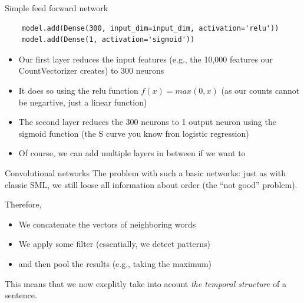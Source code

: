 \documentclass[compress]{beamer}
\begin{document}
\begin{frame}[fragile]{Simple feed forward network}
	\begin{lstlisting}
	model.add(Dense(300, input_dim=input_dim, activation='relu'))
	model.add(Dense(1, activation='sigmoid'))
	\end{lstlisting}	
	
	\begin{itemize}[<+->]
		\item Our first layer reduces the input features (e.g., the 10,000 features our CountVectorizer creates) to 300 neurons
		\item It does so using the relu function $f(x) = max(0, x)$ (as our counts cannot be negartive, just a linear function)
		\item The second layer reduces the 300 neurons to 1 output neuron using the sigmoid function (the S curve you know fron logistic regression)
		\item Of course, we can add multiple layers in between if we want to
	\end{itemize}
\end{frame}





\begin{frame}{Convolutional networks}
	The problem with such a basic networks: just as with classic SML, we still loose all information about order (the ``not good'' problem).
	
	Therefore,
	\begin{itemize}
		\item We concatenate the vectors of neighboring words
		\item We apply some filter (essentially, we detect patterns)
		\item and then pool the results (e.g., taking the maximum)
	\end{itemize}
	This means that we now excplitly take into acount \emph{the temporal structure} of a sentence.
\end{frame}
\end{document}
